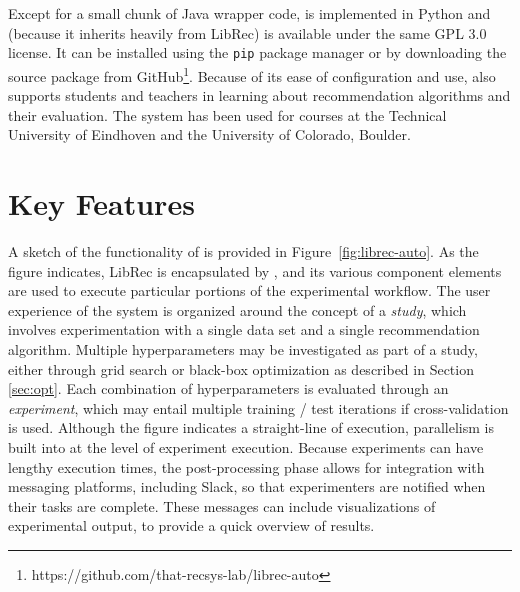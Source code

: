 Except for a small chunk of Java wrapper code, \libauto{} is implemented in Python and (because it inherits heavily from LibRec) is available under the same GPL 3.0 license. It can be installed using the \texttt{pip} package manager or by downloading the source package from GitHub\footnote{https://github.com/that-recsys-lab/librec-auto}. Because of its ease of configuration and use, \libauto{} also supports students and teachers in learning about recommendation algorithms and their evaluation. The system has been used for courses at the Technical University of Eindhoven and the University of Colorado, Boulder. 

\section{Key Features}





A sketch of the functionality of \libauto{} is provided in Figure~\ref{fig:librec-auto}. As the figure indicates, LibRec is encapsulated by \libauto{}, and its various component elements are used to execute particular portions of the experimental workflow. The user experience of the system is organized around the concept of a \textit{study}, which involves experimentation with a single data set and a single recommendation algorithm. Multiple hyperparameters may be investigated as part of a study, either through grid search or black-box optimization as described in Section \ref{sec:opt}. Each combination of hyperparameters is evaluated through an \textit{experiment}, which may entail multiple training / test iterations if cross-validation is used. Although the figure indicates a straight-line of execution, parallelism is built into \libauto{} at the level of experiment execution. Because experiments can have lengthy execution times, the post-processing phase allows for integration with messaging platforms, including Slack, so that experimenters are notified when their tasks are complete. These messages can include visualizations of experimental output, to provide a quick overview of results.

